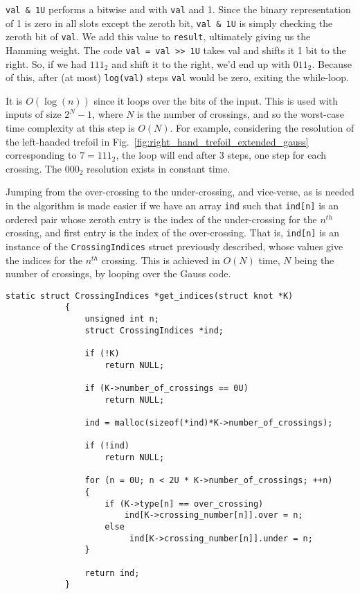 \documentclass{article}
\theoremstyle{plain}
\begin{document}
        \texttt{val \& 1U} performs a bitwise and with \texttt{val} and
        1. Since the binary representation of 1 is zero in all slots except the
        zeroth bit, \texttt{val \& 1U} is simply checking the zeroth bit of
        \texttt{val}. We add this value to \texttt{result}, ultimately giving
        us the Hamming weight. The code
        \texttt{val = val >> 1U} takes val and shifts it 1 bit to the right.
        So, if we had $111_{2}$ and shift it to the right, we'd end up with
        $011_{2}$. Because of this, after (at most) \texttt{log(val)} steps
        \texttt{val} would be zero, exiting the while-loop.
        \par\hfill\par
        It is $O(\log(n))$ since it loops over the bits of the input. This is
        used with inputs of size $2^{N}-1$, where $N$ is the number of
        crossings, and so the worst-case time complexity at this step is $O(N)$.
        For example, considering the resolution of the left-handed trefoil
        in Fig.~\ref{fig:right_hand_trefoil_extended_gauss} corresponding to
        $7=111_{2}$, the loop will end after 3 steps, one step for each
        crossing. The $000_{2}$ resolution exists in constant time.
        \par\hfill\par
        Jumping from the over-crossing to the under-crossing, and vice-verse,
        as is needed in the algorithm is made easier if we have an array
        \texttt{ind} such that \texttt{ind[n]} is an ordered pair whose
        zeroth entry is the index of the under-crossing for the $n^{th}$
        crossing, and first entry is the index of the over-crossing. That is,
        \texttt{ind[n]} is an instance of the
        \texttt{CrossingIndices} struct previously described, whose values
        give the indices for the $n^{th}$ crossing. This is achieved in
        $O(N)$ time, $N$ being the number of crossings, by looping over the
        Gauss code.
        \begin{lstlisting}[style=CStyle, gobble=12]
            static struct CrossingIndices *get_indices(struct knot *K)
            {
                unsigned int n;
                struct CrossingIndices *ind;

                if (!K)
                    return NULL;

                if (K->number_of_crossings == 0U)
                    return NULL;

                ind = malloc(sizeof(*ind)*K->number_of_crossings);

                if (!ind)
                    return NULL;

                for (n = 0U; n < 2U * K->number_of_crossings; ++n)
                {
                    if (K->type[n] == over_crossing)
                        ind[K->crossing_number[n]].over = n;
                    else
                         ind[K->crossing_number[n]].under = n;
                }

                return ind;
            }
        \end{lstlisting}
\end{document}
